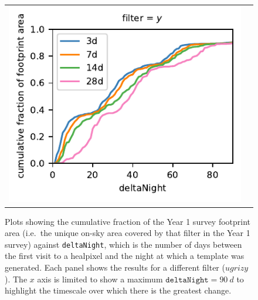 \documentclass[preprintm,linenumbers]{aastex631}
\newcommand{\deltaNight}{\texttt{deltaNight}\xspace}
\begin{document}
\begin{figure}
\begin{tabular}{@{}c@{}c@{}}
	\includegraphics{results/first_year_one_snap_v4_0_10yrs_db_noDD_noTwi_doAllTemplateMetrics_reduceDeltaNight_y.pdf}\\
\end{tabular}
			\caption{Plots showing the cumulative fraction of the Year 1 survey footprint area (i.e.\ the unique on-sky area covered by that filter in the Year 1 survey) against \deltaNight, which is the number of days between the first visit to a healpixel and the night at which a template was generated.
				Each panel shows the results for a different filter ($ugrizy$).
				The $x$ axis is limited to show a maximum $\deltaNight=90\ \si{d}$ to highlight the timescale over which there is the greatest change.
			}
			\label{fig:cumFrac_deltaNight}
		\end{figure}
  		
\end{document}
